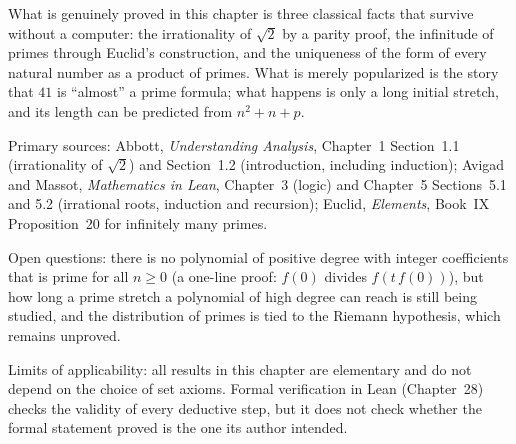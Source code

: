 \begin{untukpeneliti}
What is genuinely proved in this chapter is three classical facts that survive without a computer:
the irrationality of $\sqrt{2}$ by a parity proof, the infinitude of primes through
Euclid's construction, and the uniqueness of the form of every natural number as a product of primes.
What is merely popularized is the story that $41$ is ``almost'' a prime formula; what happens
is only a long initial stretch, and its length can be predicted from $n^{2}+n+p$.

Primary sources: Abbott, \emph{Understanding Analysis}, Chapter~1 Section~1.1 (irrationality
of $\sqrt{2}$) and Section~1.2 (introduction, including induction); Avigad and Massot,
\emph{Mathematics in Lean}, Chapter~3 (logic) and Chapter~5 Sections~5.1 and 5.2
(irrational roots, induction and recursion); Euclid, \emph{Elements}, Book~IX
Proposition~20 for infinitely many primes.

Open questions: there is no polynomial of positive degree with integer coefficients
that is prime for all $n \geq 0$ (a one-line proof: $f(0)$ divides
$f(t\,f(0))$), but how long a prime stretch a polynomial of high degree can reach
is still being studied, and the distribution of primes is tied to the Riemann hypothesis,
which remains unproved.

Limits of applicability: all results in this chapter are elementary and do not depend on the choice of set
axioms. Formal verification in Lean (Chapter~28) checks the validity of every deductive step,
but it does not check whether the formal statement proved is the one its author
intended.
\end{untukpeneliti}

